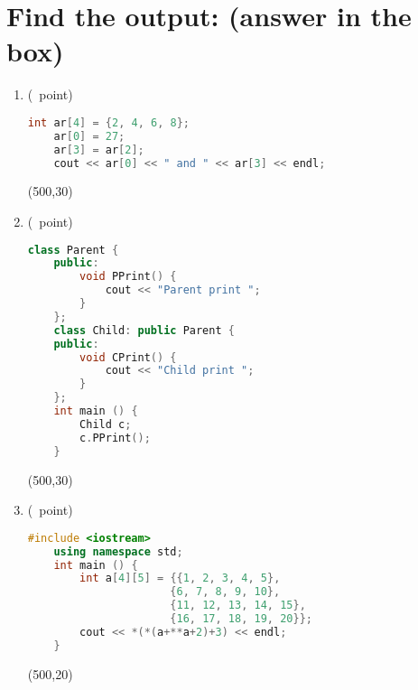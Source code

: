 \documentclass[14pt]{article}
\begin{document}
\section{Find the output: (answer in the box)}
\begin{enumerate}[label=\alph*)]
    \item (\textonequarter\ point)
    \begin{lstlisting}[language=C++, title={Part (a)}]
    int ar[4] = {2, 4, 6, 8};
    ar[0] = 27;
    ar[3] = ar[2];
    cout << ar[0] << " and " << ar[3] << endl;
    \end{lstlisting}
    \framebox(500,30){}
    
    \item (\textonequarter\ point)
    \begin{lstlisting}[language=C++, title={Part (b)}]
    class Parent {
    public:
        void PPrint() {
            cout << "Parent print ";
        }
    };
    class Child: public Parent {
    public:
        void CPrint() {
            cout << "Child print ";
        }
    };
    int main () {
        Child c;
        c.PPrint();
    }
    \end{lstlisting}
    \framebox(500,30){}
    
    \item (\textonequarter\ point)
    \begin{lstlisting}[language=C++, title={Part (c)}]
    #include <iostream>
    using namespace std;
    int main () {
        int a[4][5] = {{1, 2, 3, 4, 5},
                      {6, 7, 8, 9, 10},
                      {11, 12, 13, 14, 15},
                      {16, 17, 18, 19, 20}};
        cout << *(*(a+**a+2)+3) << endl;
    }
    \end{lstlisting}
    \framebox(500,20){}
    

\end{enumerate}
\end{document}
